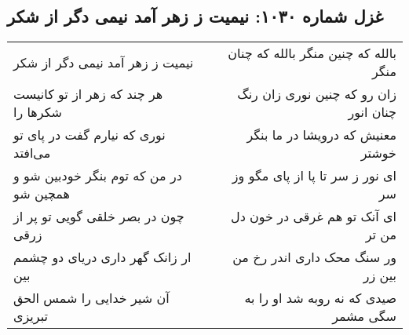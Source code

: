 \begin{center}
\section*{غزل شماره ۱۰۳۰: نیمیت ز زهر آمد نیمی دگر از شکر}
\label{sec:1030}
\begin{longtable}{l p{0.5cm} r}
نیمیت ز زهر آمد نیمی دگر از شکر
&&
بالله که چنین منگر بالله که چنان منگر
\\
هر چند که زهر از تو کانیست شکرها را
&&
زان رو که چنین نوری زان رنگ چنان انور
\\
نوری که نیارم گفت در پای تو می‌افتد
&&
معنیش که درویشا در ما بنگر خوشتر
\\
در من که توم بنگر خودبین شو و همچین شو
&&
ای نور ز سر تا پا از پای مگو وز سر
\\
چون در بصر خلقی گویی تو پر از زرقی
&&
ای آنک تو هم غرقی در خون دل من تر
\\
ار زانک گهر داری دریای دو چشمم بین
&&
ور سنگ محک داری اندر رخ من بین زر
\\
آن شیر خدایی را شمس الحق تبریزی
&&
صیدی که نه روبه شد او را به سگی مشمر
\\
\end{longtable}
\end{center}
